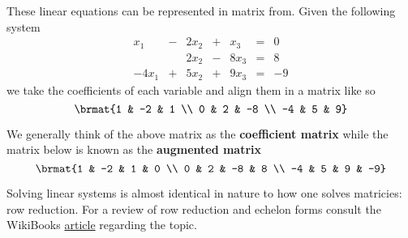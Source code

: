 \begin{example} These linear equations can be represented in matrix from. Given the following system
\[ \begin{array}{rrrrrrr} x_1 & - & 2x_2 & + &  x_3 & = & 0 \\
						      &   & 2x_2 & - & 8x_3 & = & 8 \\
						-4x_1 & + & 5x_2 & + & 9x_3 & = & -9 \end{array} \]
we take the coefficients of each variable and align them in a matrix like so
\[ \brmat{1 & -2 & 1 \\ 0 & 2 & -8 \\ -4 & 5 & 9} \]

We generally think of the above matrix as the \textbf{coefficient matrix} while the matrix below is known as the \textbf{augmented matrix}
\[ \brmat{1 & -2 & 1 & 0 \\ 0 & 2 & -8 & 8 \\ -4 & 5 & 9 & -9} \]
\end{example}
Solving linear systems is almost identical in nature to how one solves matricies: row reduction. For a review of row reduction and echelon forms consult the WikiBooks \href{http://en.wikibooks.org/wiki/Linear_Algebra/Row_Reduction_and_Echelon_Forms}{article} regarding the topic.


